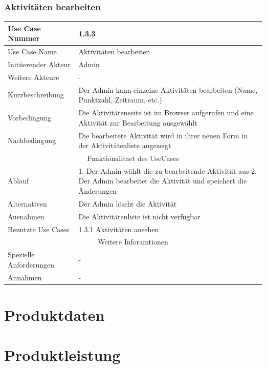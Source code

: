 \documentclass[10pt,a4paper]{article}
\begin{document}
	\subsubsection{Aktivit\"aten bearbeiten}
	\begin{tabular}{|l|p{.5\linewidth}|}
	\hline Use Case Nummer & 1.3.3 \\ 
	\hline Use Case Name & Aktivit\"aten bearbeiten \\ 
	\hline Initiierender Akteur & Admin \\
	\hline Weitere Akteure & - \\
	\hline Kurzbeschreibung & Der Admin kann einzelne Aktivit\"aten bearbeiten (Name, Punktzahl, Zeitraum, etc.) \\
	\hline Vorbedingung & Die Aktivit\"atenseite ist im Browser aufgerufen und eine Aktivit\"at zur Bearbeitung ausgew\"ahlt \\
	\hline Nachbedingung & Die bearbeitete Aktivit\"at wird in ihrer neuen Form in der Aktivit\"atenliste angezeigt \\
	\hline \multicolumn{2}{|c|}{Funktionalitaet des UseCases}\\
	\hline Ablauf & 1. Der Admin w\"ahlt die zu bearbeitende Aktivit\"at aus 2. Der Admin bearbeitet die Aktivit\"at und speichert die \"Anderungen \\
	\hline Alternativen & Der Admin l\"oscht die Aktivit\"at \\
	\hline Ausnahmen & Die Aktivit\"atenliste ist nicht verf\"ugbar \\
	\hline Benutzte Use Cases & 1.3.1 Aktivit\"aten ansehen \\
	\hline \multicolumn{2}{|c|}{Weitere Inforamtionen} \\
	\hline Spezielle Anforderungen & - \\
	\hline Annahmen & - \\
	\hline
	\end{tabular} 

\section{Produktdaten}

\section{Produktleistung}
\end{document}
